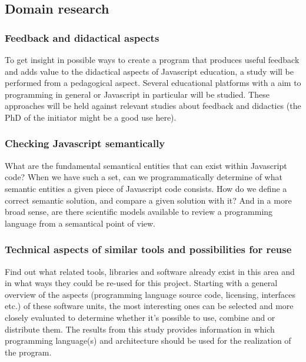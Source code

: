 \documentclass{article}
\begin{document}

\subsection{Domain research}

\subsubsection{Feedback and didactical aspects}
To get insight in possible ways to create a program that produces useful feedback and adds value to the didactical aspects of Javascript education, a study will be performed from a pedagogical aspect. Several educational platforms with a aim to programming in general or Javascript in particular will be studied. These approaches will be held against relevant studies about feedback and didactics (the PhD of the initiator might be a good use here).
\subsubsection{Checking Javascript semantically}
What are the fundamental semantical entities that can exist within Javascript code? When we have such a set, can we programmatically determine of what semantic entities a given piece of Javascript code consists. How do we define a correct semantic solution, and compare a given solution with it? And in a more broad sense, are there scientific models available to review a programming language from a semantical point of view.
\subsubsection{Technical aspects of similar tools and possibilities for reuse}
Find out what related tools, libraries and software already exist in this area and in what ways they could be re-used for this project. Starting with a general overview of the aspects (programming language source code, licensing, interfaces etc.) of these software units, the most interesting ones can be selected and more closely evaluated to determine whether it's possible to use, combine and or distribute them. The results from this study provides information in which programming language(s) and architecture should be used for the realization of the program.
\end{document}
